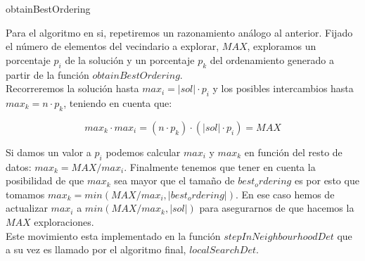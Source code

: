 \documentclass[11pt,a4paper]{article}
\begin{document}
	\begin{algorithm}[H]
		\caption{obtainBestOrdering}
	\end{algorithm}
	
	Para el algoritmo en si, repetiremos un razonamiento análogo al anterior. Fijado el número de elementos del vecindario a explorar, $MAX$, exploramos un porcentaje $p_i$ de la solución y un porcentaje $p_k$ del ordenamiento generado a partir de la función $obtainBestOrdering$. \\
	
	Recorreremos la solución hasta $max_i = |sol| \cdot p_i$ y los posibles intercambios hasta $max_k = n \cdot p_k$, teniendo en cuenta que:
	
	$$ max_k \cdot max_i = (n \cdot p_k) \cdot (|sol| \cdot p_i) = MAX$$ 
	
	Si damos un valor a $p_i$ podemos calcular $max_i$ y $max_k$ en función del resto de datos: $ max_k = MAX / max_i $. Finalmente tenemos que tener en cuenta la posibilidad de que $max_k$ sea mayor que el tamaño de $best_ordering$ es por esto que tomamos $max_k = min(MAX / max_i , |best_ordering|)$. En ese caso hemos de actualizar $max_i$ a $min(MAX / max_k, |sol|)$ para asegurarnos de que hacemos la $MAX$ exploraciones. \\ 
	
	Este movimiento esta implementado en la función $stepInNeighbourhoodDet$ que a su vez es llamado por el algoritmo final, $localSearchDet$. \\
	
\end{document}
